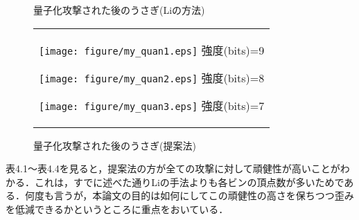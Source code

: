 \documentclass[11pt]{jreport}
\begin{document}
{\begin{figure}[htbp]
\begin{center}
\begin{tabular}{c}
    \end{tabular}
    \caption{量子化攻撃された後のうさぎ(Liの方法)}
    \label{fig:quan1}
  \end{center}
\end{figure}



\begin{figure}[htbp]
  \begin{center}
    \begin{tabular}{c}

      \begin{minipage}{0.33\hsize}
        \begin{center}
          \texttt{[image: figure/my\_quan1.eps]}
          \hspace{1.6cm} 強度(bits)=9
        \end{center}
      \end{minipage}

      \begin{minipage}{0.33\hsize}
        \begin{center}
          \texttt{[image: figure/my\_quan2.eps]}
          \hspace{1.6cm} 強度(bits)=8
        \end{center}
      \end{minipage}

      \begin{minipage}{0.33\hsize}
        \begin{center}
          \texttt{[image: figure/my\_quan3.eps]}
          \hspace{1.6cm} 強度(bits)=7
        \end{center}
      \end{minipage}

    \end{tabular}
    \caption{量子化攻撃された後のうさぎ(提案法)}
    \label{fig:quan1}
  \end{center}
\end{figure}

\newpage
表4.1～表4.4を見ると，提案法の方が全ての攻撃に対して頑健性が高いことがわかる．これは，すでに述べた通りLiの手法よりも各ビンの頂点数が多いためである．何度も言うが，本論文の目的は如何にしてこの頑健性の高さを保ちつつ歪みを低減できるかというところに重点をおいている．


}
\end{document}
